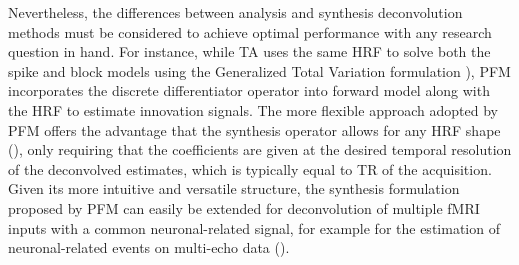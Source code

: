 Nevertheless, the differences between analysis and synthesis deconvolution methods must be considered to achieve optimal performance with any research question in hand. For instance, while TA uses the same HRF to solve both the spike and block models using the Generalized Total Variation formulation \citealt{Karahanoglu2011SignalProcessingApproach}), PFM incorporates the discrete differentiator operator into forward model along with the HRF to estimate innovation signals. The more flexible approach adopted by PFM offers the advantage that the synthesis operator allows for any HRF shape (\citealt{Elad2007Analysisversussynthesis}), only requiring that the coefficients are given at the desired temporal resolution of the deconvolved estimates, which is typically equal to TR of the acquisition. Given its more intuitive and versatile structure, the synthesis formulation proposed by PFM can easily be extended for deconvolution of multiple fMRI inputs with a common neuronal-related signal, for example for the estimation of neuronal-related events on multi-echo data (\citealt{CaballeroGaudes2019deconvolutionalgorithmmulti}).


